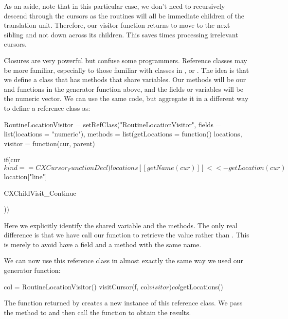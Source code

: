 As an aside, note that in this particular case, we don't need to
recursively descend through the cursors as the routines will all be
immediate children of the translation unit.  Therefore, our visitor
function returns  to move to the next
sibling and not down across its children.  This saves times processing
irrelevant cursors.

Closures are very powerful but confuse some \R{} programmers.
Reference classes may be more familiar, especially to those familiar
with classes in \Cpp, \Java{} or \Python.  The idea is that we define
a class that has methods that share variables.  Our methods will be
our  and  functions in the generator
function above, and the fields or variables will be the
 numeric vector.  We can use the same code, but
aggregate it in a different way to define a reference class as:
\begin{RCode}
RoutineLocationVisitor =
setRefClass("RoutineLocationVisitor",
    fields = list(locations = "numeric"),
    methods = list(getLocations = function() 
                                     locations,
                   visitor = 
                       function(cur, parent) {
                         if(cur$kind == CXCursor_FunctionDecl) 
                            locations[[ getName(cur) ]] <<- 
                                   getLocation(cur)$location["line"]
                               
                         CXChildVisit_Continue
                       }))
\end{RCode}
Here we explicitly identify the shared variable and the methods.  The
only real difference is that we have call our function to retrieve the
 value  rather than
.  This is merely to avoid have a field and a method
with the same name.

We can now use this reference class in almost exactly the same way we
used our  generator function:
\begin{RCode}
col = RoutineLocationVisitor()
visitCursor(f, col$visitor)
col$getLocations()
\end{RCode}
The  function returned by
 creates a new instance of this reference class.
We pass the  method to  and then
call the function  to obtain the results.



